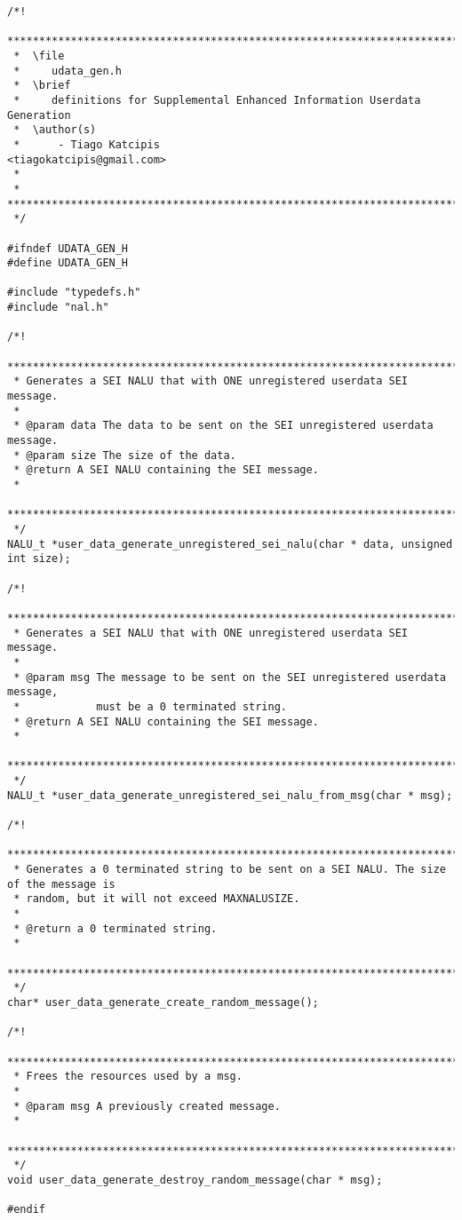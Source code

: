 \begin{lstlisting}
/*!
 *******************************************************************************
 *  \file
 *     udata_gen.h
 *  \brief
 *     definitions for Supplemental Enhanced Information Userdata Generation
 *  \author(s)
 *      - Tiago Katcipis                             <tiagokatcipis@gmail.com>
 *
 * *****************************************************************************
 */

#ifndef UDATA_GEN_H
#define UDATA_GEN_H

#include "typedefs.h"
#include "nal.h"

/*!
 *****************************************************************************************
 * Generates a SEI NALU that with ONE unregistered userdata SEI message.
 *
 * @param data The data to be sent on the SEI unregistered userdata message.
 * @param size The size of the data.
 * @return A SEI NALU containing the SEI message.
 *
 *****************************************************************************************
 */
NALU_t *user_data_generate_unregistered_sei_nalu(char * data, unsigned int size);

/*!
 *****************************************************************************************
 * Generates a SEI NALU that with ONE unregistered userdata SEI message.
 *
 * @param msg The message to be sent on the SEI unregistered userdata message, 
 *            must be a 0 terminated string.
 * @return A SEI NALU containing the SEI message.
 *
 ******************************************************************************************
 */
NALU_t *user_data_generate_unregistered_sei_nalu_from_msg(char * msg);

/*!
 *******************************************************************************************
 * Generates a 0 terminated string to be sent on a SEI NALU. The size of the message is
 * random, but it will not exceed MAXNALUSIZE.
 *
 * @return a 0 terminated string.
 *
 ********************************************************************************************
 */
char* user_data_generate_create_random_message();

/*!
 *******************************************************************************************
 * Frees the resources used by a msg.
 *
 * @param msg A previously created message.
 *
 ********************************************************************************************
 */
void user_data_generate_destroy_random_message(char * msg);

#endif
\end{lstlisting}

